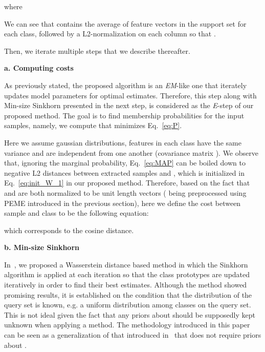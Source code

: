\documentclass[review]{elsarticle}
\begin{document}
where 

We can see that  contains the average of feature vectors in the support set for each class, followed by a L2-normalization on each column so that . 

Then, we iterate multiple steps that we describe thereafter.

\textbf{a. Computing costs}

As previously stated, the proposed algorithm is an \emph{EM}-like one that iterately updates model parameters for optimal estimates. Therefore, this step along with Min-size Sinkhorn presented in the next step, is considered as the \emph{E}-step of our proposed method. The goal is to find membership probabilities for the input samples, namely, we compute  that minimizes Eq.~\ref{eq:P}.

Here we assume gaussian distributions, features in each class have the same variance and are independent from one another (covariance matrix ). We observe that, ignoring the marginal probability, Eq.~\ref{eq:MAP} can be boiled down to negative L2 distances between extracted samples  and , which is initialized in Eq.~\ref{eq:init_W_1} in our proposed method. Therefore, based on the fact that  and  are both normalized to be unit length vectors ( being preprocessed using PEME introduced in the previous section), here we define the cost between sample  and class  to be the following equation:

which corresponds to the cosine distance.



\textbf{b. Min-size Sinkhorn}

In~\cite{hu2021leveraging}, we proposed a Wasserstein distance based method in which the Sinkhorn algorithm is applied at each iteration so that the class prototypes are updated iteratively in order to find their best estimates. Although the method showed promising results, it is established on the condition that the distribution of the query set is known, e.g. a uniform distribution among classes on the query set. This is not ideal given the fact that any priors about  should be supposedly kept unknown when applying a method. The methodology introduced in this paper can be seen as a generalization of that introduced in~\cite{hu2021leveraging} that does not require priors about .
\end{document}
